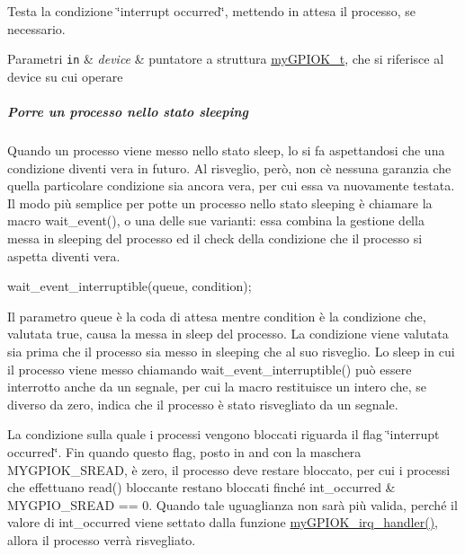 Testa la condizione \char`\"{}interrupt occurred\char`\"{}, mettendo in attesa il processo, se necessario. 


\begin{DoxyParams}[1]{Parametri}
\mbox{\tt in}  & {\em device} & puntatore a struttura \hyperlink{structmy_g_p_i_o_k__t}{my\+G\+P\+I\+O\+K\+\_\+t}, che si riferisce al device su cui operare\\
\hline
\end{DoxyParams}
\subparagraph*{Porre un processo nello stato sleeping}

Quando un processo viene messo nello stato sleep, lo si fa aspettandosi che una condizione diventi vera in futuro. Al risveglio, però, non c\textquotesingle{}è nessuna garanzia che quella particolare condizione sia ancora vera, per cui essa va nuovamente testata. Il modo più semplice per potte un processo nello stato sleeping è chiamare la macro wait\+\_\+event(), o una delle sue varianti\+: essa combina la gestione della messa in sleeping del processo ed il check della condizione che il processo si aspetta diventi vera. 
\begin{DoxyCode}
wait\_event\_interruptible(queue, condition);
\end{DoxyCode}
 Il parametro queue è la coda di attesa mentre condition è la condizione che, valutata true, causa la messa in sleep del processo. La condizione viene valutata sia prima che il processo sia messo in sleeping che al suo risveglio. Lo sleep in cui il processo viene messo chiamando wait\+\_\+event\+\_\+interruptible() può essere interrotto anche da un segnale, per cui la macro restituisce un intero che, se diverso da zero, indica che il processo è stato risvegliato da un segnale.

La condizione sulla quale i processi vengono bloccati riguarda il flag \char`\"{}interrupt occurred\char`\"{}. Fin quando questo flag, posto in and con la maschera M\+Y\+G\+P\+I\+O\+K\+\_\+\+S\+R\+E\+AD, è zero, il processo deve restare bloccato, per cui i processi che effettuano read() bloccante restano bloccati finché int\+\_\+occurred \& M\+Y\+G\+P\+I\+O\+\_\+\+S\+R\+E\+AD == 0. Quando tale uguaglianza non sarà più valida, perché il valore di int\+\_\+occurred viene settato dalla funzione \hyperlink{group___linux-_driver_ga2fc230a12a97aa63e43b2dc4aec73511}{my\+G\+P\+I\+O\+K\+\_\+irq\+\_\+handler()}, allora il processo verrà risvegliato. \mbox{\label{group__my_g_p_i_o_k__t_gae182aa943af08c102a05795ae8526192}} 
